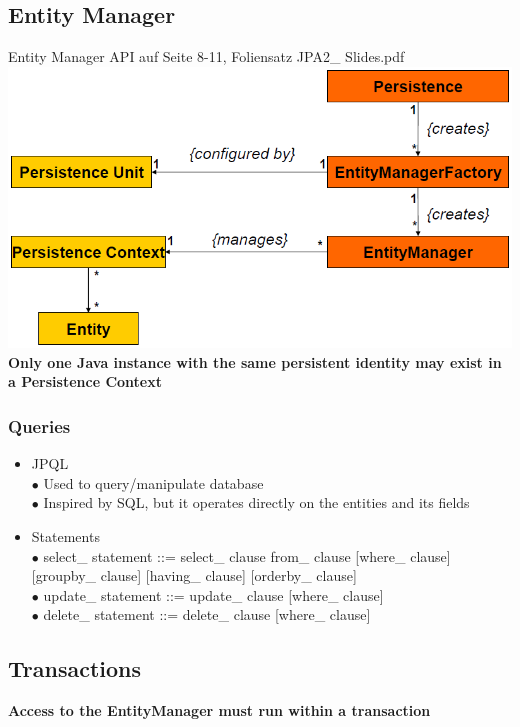 \documentclass[10pt]{scrartcl}
\newcommand{\Bold}[1]{\textbf{#1}} %
\begin{document}
\subsection{Entity Manager}
Entity Manager API auf Seite 8-11, Foliensatz JPA2\_ Slides.pdf\\
\includegraphics[scale=0.5]{entitymanager.png}\\
\Bold{Only one Java instance with the same persistent identity may exist in a Persistence Context}\\

\subsubsection{Queries}
\begin{itemize}
\item JPQL\\
$\bullet$ Used to query/manipulate database\\
$\bullet$ Inspired by SQL, but it operates directly on the entities and its fields
\item Statements\\
$\bullet$ select\_ statement ::= select\_ clause from\_ clause [where\_ clause] [groupby\_ clause] [having\_ clause] [orderby\_ clause]\\
$\bullet$ update\_ statement ::= update\_ clause [where\_ clause]\\
$\bullet$ delete\_ statement ::= delete\_ clause [where\_ clause]
\end{itemize}
\subsection{Transactions}
\Bold{Access to the EntityManager must run within a transaction}
\end{document}
